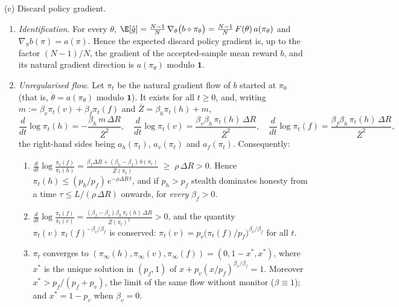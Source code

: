 \begin{theorem}
\smallskip\noindent\textup{(c) Discard policy gradient.}
\begin{enumerate}
\item[\textup{(c1)}] \emph{Identification.} For every $\theta$,
$\E[\hat g]=\frac{N-1}{N}\,\nabla_\theta\bigl(b\circ\pi_\theta\bigr)
=\frac{N-1}{N}\,F(\theta)\,a(\pi_\theta)$ and $\nabla_\pi b(\pi)=a(\pi)$.
Hence the expected discard policy gradient is, up to the factor $(N-1)/N$,
the gradient of the accepted-sample mean reward $b$, and its natural
gradient direction is $a(\pi_\theta)$ modulo $\mathbf 1$.
\item[\textup{(c2)}] \emph{Unregularised flow.} Let $\pi_t$ be the natural
gradient flow of $b$ started at $\pi_0$ (that is, $\dot\theta=a(\pi_\theta)$
modulo $\mathbf 1$). It exists for all $t\ge0$, and, writing
$m:=\beta_v\pi_t(v)+\beta_f\pi_t(f)$ and $\bar Z=\beta_h\pi_t(h)+m$,
\begin{equation}\label{eq:discard-a}
\frac{d}{dt}\log\pi_t(h)=-\frac{\beta_h\,m\,\Delta R}{\bar Z^{2}},\quad
\frac{d}{dt}\log\pi_t(v)=\frac{\beta_v\beta_h\,\pi_t(h)\,\Delta R}{\bar Z^{2}},\quad
\frac{d}{dt}\log\pi_t(f)=\frac{\beta_f\beta_h\,\pi_t(h)\,\Delta R}{\bar Z^{2}} ,
\end{equation}
the right-hand sides being $a_h(\pi_t)$, $a_v(\pi_t)$ and $a_f(\pi_t)$.
Consequently:
\begin{enumerate}
\item[\textup{(i)}] $\displaystyle\frac{d}{dt}\log\frac{\pi_t(f)}{\pi_t(h)}
=\frac{\beta_f\Delta R+(\beta_h-\beta_f)\,b(\pi_t)}{\bar Z(\pi_t)}
\;\ge\;\rho\,\Delta R>0$. Hence
$\pi_t(h)\le (p_h/p_f)\,e^{-\rho\Delta R\,t}$, and if $p_h>p_f$ stealth
dominates honesty from a time $\tau\le L/(\rho\,\Delta R)$ onwards, for
\emph{every} $\beta_f>0$.
\item[\textup{(ii)}] $\displaystyle\frac{d}{dt}\log\frac{\pi_t(f)}{\pi_t(v)}
=\frac{(\beta_f-\beta_v)\beta_h\,\pi_t(h)\,\Delta R}{\bar Z(\pi_t)^{2}}>0$,
and the quantity $\pi_t(v)\,\pi_t(f)^{-\beta_v/\beta_f}$ is conserved:
$\pi_t(v)=p_v\bigl(\pi_t(f)/p_f\bigr)^{\beta_v/\beta_f}$ for all $t$.
\item[\textup{(iii)}] $\pi_t$ converges to $(\pi_\infty(h),\pi_\infty(v),\pi_\infty(f))=(0,1-x^\ast,x^\ast)$,
where $x^\ast$ is the unique solution in $(p_f,1)$ of
$x+p_v(x/p_f)^{\beta_v/\beta_f}=1$. Moreover
$x^\ast>p_f/(p_f+p_v)$, the limit of the same flow without monitor
($\beta\equiv1$); and $x^\ast=1-p_v$ when $\beta_v=0$.
\end{enumerate}
\end{enumerate}
\end{theorem}

